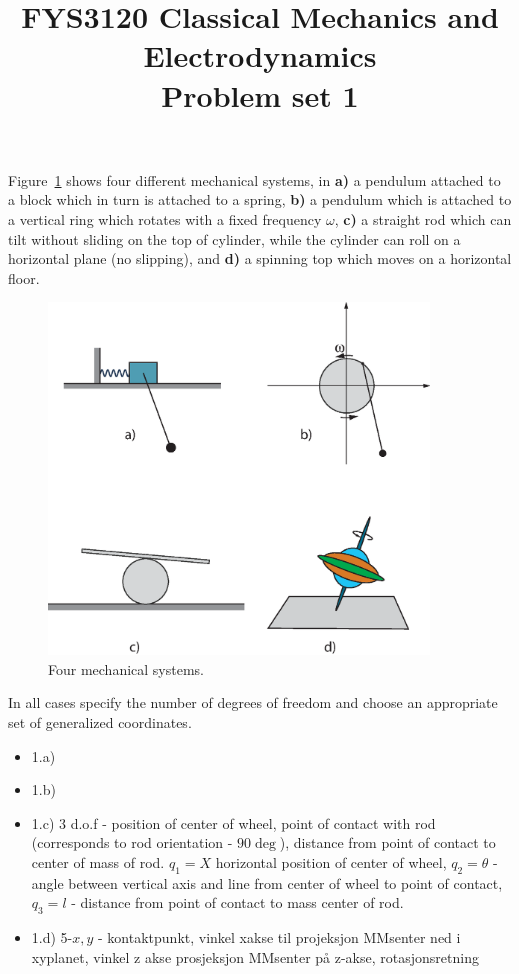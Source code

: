 \documentclass[11pt,a4paper]{report}
\title{FYS3120 Classical Mechanics and Electrodynamics\\ 
\vspace{15mm}Problem set 1}
\newcounter{excount}[chapter]
\newenvironment{exercise}[1][]{\addtocounter{excount}{1} \noindent {\bf Problem
    \arabic{excount} \ \ #1}\hspace{2mm}}{\vspace{4mm}}
\begin{document}
\maketitle

\begin{exercise}
Figure~\ref{fig:gc} shows four different mechanical systems, in {\bf a)} a pendulum attached to a block which in turn is attached to a spring, {\bf b)} a pendulum which is attached to a vertical ring which rotates with a fixed frequency $\omega$, {\bf c)} a straight rod which can tilt without sliding on the top of cylinder, while the cylinder can roll on a horizontal plane (no slipping), and {\bf d)} a spinning top which moves on a horizontal floor.

\begin{figure}[h!]
\begin{center}
\includegraphics[width=0.9\textwidth]{Fig1-1.eps}
\end{center}
\caption{Four mechanical systems.}
\label{fig:gc}
\end{figure}

In all cases specify the number of degrees of freedom and choose an appropriate set of generalized coordinates.

\begin{itemize}
\item 1.a)
\item 1.b)
\item 1.c)
$3$ d.o.f - position of center of wheel, point of contact with rod (corresponds to rod orientation - $90 \deg$), distance from point of contact to center of mass of rod. $q_1=X$ horizontal position of center of wheel, $q_2=\theta$ - angle between vertical axis and line from center of wheel to point of contact, $q_3=l$ - distance from point of contact to mass center of rod.
\item 1.d)
5-$x,y$ - kontaktpunkt, vinkel xakse til projeksjon MMsenter ned i xyplanet, vinkel z akse prosjeksjon MMsenter på z-akse, rotasjonsretning
\end{itemize}

\end{exercise}
\end{document}

